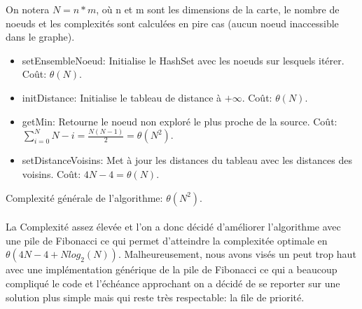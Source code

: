 \documentclass[12pt,a4paper]{article}
\begin{document}
On notera $N = n*m$, où n et m sont les dimensions de la carte, le nombre de noeuds et les complexités sont calculées en pire cas (aucun noeud inaccessible dans le graphe).
\begin{itemize}
	\item setEnsembleNoeud: Initialise le HashSet avec les noeuds sur lesquels itérer. Coût: $\theta(N)$.
	\item initDistance: Initialise le tableau de distance à $+\infty$. Coût: $\theta(N)$.
	\item getMin: Retourne le noeud non exploré le plus proche de la source. Coût: $\sum\limits_{i=0}^{N}{N-i} = \frac{N(N-1)}{2} = \theta(N^2)$.
	\item setDistanceVoisins: Met à jour les distances du tableau avec les distances des voisins. Coût: $4N-4 = \theta(N)$.\\
\end{itemize}
Complexité générale de l'algorithme: $\theta(N^2)$.\\\\
La Complexité assez élevée et l'on a donc décidé d'améliorer l'algorithme avec une pile de Fibonacci ce qui permet d'atteindre la complexitée optimale en $\theta(4N-4 + Nlog_2(N))$. Malheureusement, nous avons visés un peut trop haut avec une implémentation générique de la pile de Fibonacci ce qui a beaucoup compliqué le code et l'échéance approchant on a décidé de se reporter sur une solution plus simple mais qui reste très respectable: la file de priorité.\\
\end{document}
